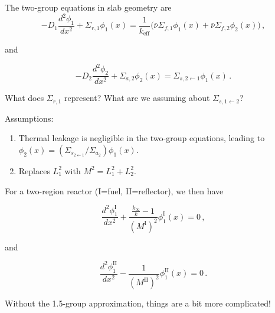 \documentclass[compact]{ne630handout}
\begin{document}
\begin{handoutflow}

The two-group equations in slab geometry are \[
 -D_1 \frac{d^2 \phi_1}{dx^2} + \Sigma_{r,1}\phi_1(x)
      = \frac{1}{k_{\text{eff}}} \Big ( \bar{\nu}\Sigma_{f,1}\phi_1(x) + \bar{\nu}\Sigma_{f,2}\phi_2(x) \Big ) \, ,
\]

and

\[
 -D_2 \frac{d^2 \phi_2}{dx^2} + \Sigma_{a,2}\phi_2(x)
      = \Sigma_{s,2\gets 1} \phi_1(x) \, .
\]

What does \(\Sigma_{r,1}\) represent? What are we assuming about \(\Sigma_{s,1\gets 2}\)?

\columnbreak
{}

Assumptions:

\begin{enumerate}
\def\labelenumi{\arabic{enumi}.}
\item
  Thermal leakage is negligible in the two-group equations, leading to \(\phi_2(x) = (\Sigma_{s_{2\gets 1}} /\Sigma_{a_2})\phi_1(x)\).
\item
  Replaces \(L_1^2\) with \(M^2 = L_1^2 + L_2^2\).
\end{enumerate}

For a two-region reactor (I=fuel, II=reflector), we then have

\[
  \frac{d^2\phi^{\text{I}}_1}{dx^2} +  \frac{  \frac{k_{\infty}}{k}  - 1}{(M^{\text{I}})^2} \phi^{\text{I}}_1(x) = 0 \, ,
\]

and

\[
  \frac{d^2\phi^{\text{II}}_1}{dx^2} - \frac{1}{(M^{\text{II}})^2} \phi^{\text{II}}_1(x) = 0 \, .
\]


Without the 1.5-group approximation, things are a bit more complicated!


\end{handoutflow}
\end{document}
